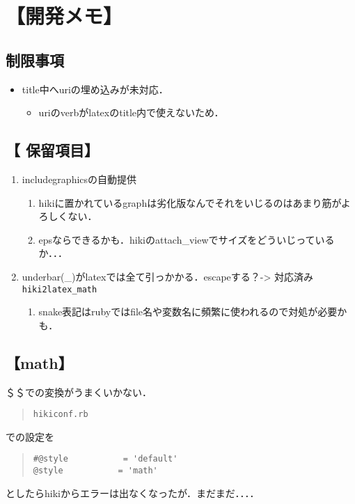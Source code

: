 \documentclass[12pt,a4paper]{jsarticle}
\begin{document}
\section{【開発メモ】}
\subsection{制限事項}\begin{itemize}
\item title中へuriの埋め込みが未対応．\begin{itemize}
\item uriのverbがlatexのtitle内で使えないため．
\end{itemize}
\end{itemize}
\subsection{【 保留項目】}\begin{enumerate}
\item includegraphicsの自動提供\begin{enumerate}
\item hikiに置かれているgraphは劣化版なんでそれをいじるのはあまり筋がよろしくない．
\item epsならできるかも．hikiのattach\_viewでサイズをどういじっているか．．．
\end{enumerate}
\item underbar(\_)がlatexでは全て引っかかる．escapeする？-> 対応済み \verb|hiki2latex_math|\begin{enumerate}
\item snake表記はrubyではfile名や変数名に頻繁に使われるので対処が必要かも．
\end{enumerate}
\end{enumerate}
\subsection{【math】}
＄＄での変換がうまくいかない．
\begin{quote}\begin{verbatim}
hikiconf.rb
\end{verbatim}\end{quote}
での設定を
\begin{quote}\begin{verbatim}
#@style           = 'default'
@style           = 'math'
\end{verbatim}\end{quote}
としたらhikiからエラーは出なくなったが．まだまだ．．．．
\end{document}
